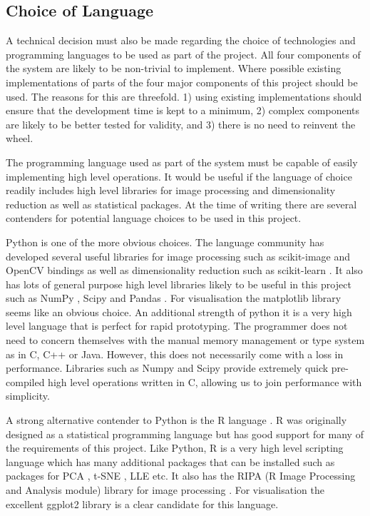 \subsection{Choice of Language}
\label{sec:choice-of-language}
A technical decision must also be made regarding the choice of technologies and programming languages to be used as part of the project. All four components of the system are likely to be non-trivial to implement. Where possible existing implementations of parts of the four major components of this project should be used. The reasons for this are threefold. 1) using existing implementations should ensure that the development time is kept to a minimum, 2) complex components are likely to be better tested for validity, and 3) there is no need to reinvent the wheel. 

The programming language used as part of the system must be capable of easily implementing high level operations. It would be useful if the language of choice readily includes high level libraries for image processing and dimensionality reduction as well as statistical packages. At the time of writing there are several contenders for potential language choices to be used in this project. 

Python \cite{pythonLanguage} is one of the more obvious choices. The language community has developed several useful libraries for image processing such as scikit-image \cite{van2014scikit} and OpenCV bindings \cite{openCV} as well as dimensionality reduction such as scikit-learn \cite{pedregosa2011scikit}. It also has lots of general purpose high level libraries likely to be useful in this project such as NumPy \cite{pythonNumpy}, Scipy \cite{jones2014scipy} and Pandas \cite{pythonPandas}. For visualisation the matplotlib library seems like an obvious choice. An additional strength of python it is a very high level language that is perfect for rapid prototyping. The programmer does not need to concern themselves with the manual memory management or type system as in C, C++ or Java. However, this does not necessarily come with a loss in performance. Libraries such as Numpy and Scipy provide extremely quick pre-compiled high level operations written in C, allowing us to join performance with simplicity.

A strong alternative contender to Python is the R language \cite{rlanguage}. R was originally designed as a statistical programming language but has good support for many of the requirements of this project. Like Python, R is a very high level scripting language which has many additional packages that can be installed such as packages for PCA \cite{rPCA}, t-SNE \cite{rtSNE}, LLE \cite{rLLE} etc. It also has the RIPA (R Image Processing and Analysis module) library for image processing \cite{rRIPA}. For visualisation the excellent ggplot2 \cite{rggplot2} library is a clear candidate for this language.

